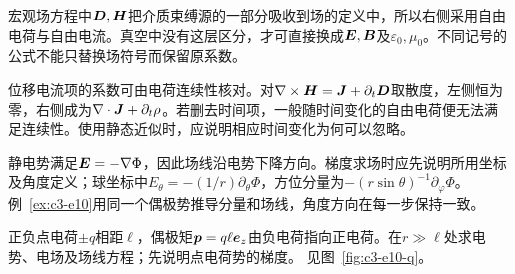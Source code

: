 宏观场方程中$\bm{D},\bm{H}$把介质束缚源的一部分吸收到场的定义中，所以右侧采用自由电荷与自由电流。真空中没有这层区分，才可直接换成$\bm{E},\bm{B}$及$\varepsilon_0,\mu_0$。不同记号的公式不能只替换场符号而保留原系数。

位移电流项的系数可由电荷连续性核对。对$\nabla\times\bm{H}=\bm{J}+\partial_t\bm{D}$取散度，左侧恒为零，右侧成为$\nabla\cdot\bm{J}+\partial_t\rho$。若删去时间项，一般随时间变化的自由电荷便无法满足连续性。使用静态近似时，应说明相应时间变化为何可以忽略。

静电势满足$\bm{E}=-\nabla\Phi$，因此场线沿电势下降方向。梯度求场时应先说明所用坐标及角度定义；球坐标中$E_\theta=-(1/r)\partial_\theta\Phi$，方位分量为$-(r\sin\theta)^{-1}\partial_\varphi\Phi$。例~\ref{ex:c3-e10}用同一个偶极势推导分量和场线，角度方向在每一步保持一致。

\begin{example}\label{ex:c3-e10}
正负点电荷$\pm q$相距$\ell$，偶极矩$\bm{p}=q\ell\bm{e}_z$由负电荷指向正电荷。在$r\gg\ell$处求电势、电场及场线方程；先说明点电荷势的梯度。 见图~\ref{fig:c3-e10-q}。
\end{example}

